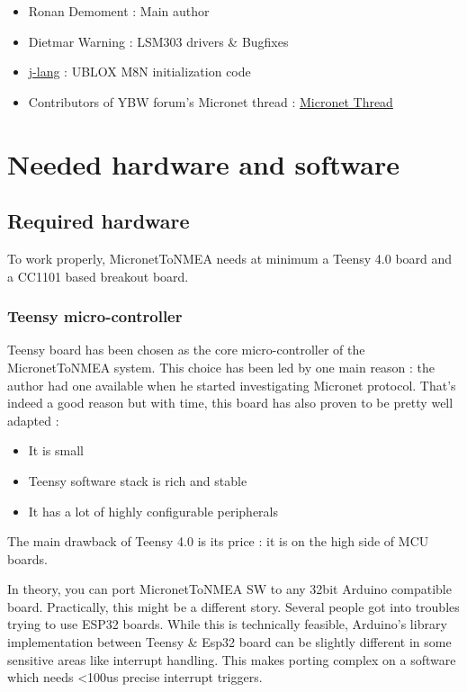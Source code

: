 \documentclass{report}
\begin{document}
\begin{itemize}
\item Ronan Demoment : Main author
\item Dietmar Warning : LSM303 drivers \& Bugfixes
\item \href{https://github.com/j-lang}{j-lang} : UBLOX M8N initialization code
\item Contributors of YBW forum's Micronet thread : \href{https://forums.ybw.com/index.php?threads/raymarines-Micronet.539500/}{Micronet Thread}
\end{itemize}

\chapter{Needed hardware and software}

\section{Required hardware}

To work properly, MicronetToNMEA needs at minimum a Teensy 4.0 board and a CC1101 based breakout board.

\subsection{Teensy micro-controller}
Teensy board has been chosen as the core micro-controller of the MicronetToNMEA system. This choice has been led by one main reason : the author had one available when he started investigating Micronet protocol. That's indeed a good reason but with time, this board has also proven to be pretty well adapted :

\begin{itemize}
	\item It is small
	\item Teensy software stack is rich and stable
	\item It has a lot of highly configurable peripherals
\end{itemize}

The main drawback of Teensy 4.0 is its price : it is on the high side of MCU boards.

In theory, you can port MicronetToNMEA SW to any 32bit Arduino compatible board. Practically, this might be a different story. Several people got into troubles trying to use ESP32 boards. While this is technically feasible, Arduino's library implementation between Teensy \& Esp32 board can be slightly different in some sensitive areas like interrupt handling. This makes porting complex on a software which needs <100us precise interrupt triggers.
\end{document}
